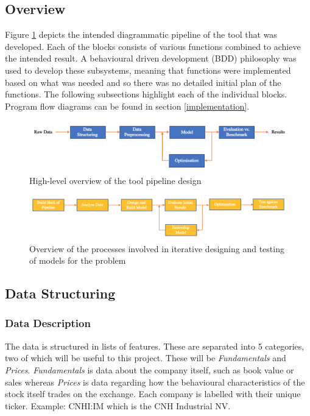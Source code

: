 \documentclass[10pt,onecolumn,letterpaper]{article}
\begin{document}
\subsection{Overview}

Figure \ref{pipeline_design} depicts the intended diagrammatic pipeline of the tool that was developed. Each of the blocks consists of various functions combined to achieve the intended result. A behavioural driven development (BDD) philosophy was used to develop these subsystems, meaning that functions were implemented based on what was needed and so there was no detailed initial plan of the functions. The following subsections highlight each of the individual blocks. Program flow diagrams can be found in section \ref{implementation}.

\begin{figure}[!hbt!]
\centering
\includegraphics[width=14.5cm]{design_pipeline.png}
\caption{High-level overview of the tool pipeline design}
\label{pipeline_design}
\end{figure}

\begin{figure}[!hbt!]
\centering
\includegraphics[width=14.5cm]{process_overview.png}
\caption{Overview of the processes involved in iterative designing and testing of models for the problem}
\label{process_overview}
\end{figure}

\subsection{Data Structuring}

\subsubsection{Data Description} \label{data_description}

The data is structured in lists of features. These are separated into 5 categories, two of which will be useful to this project. These will be \textit{Fundamentals} and \textit{Prices}. \textit{Fundamentals} is data about the company itself, such as book value or sales whereas \textit{Prices} is data regarding how the behavioural characteristics of the stock itself trades on the exchange. Each company is labelled with their unique ticker. Example: CNHI:IM which is the CNH Industrial NV. 
\end{document}
